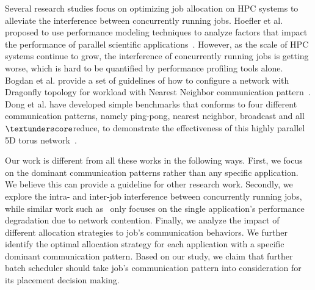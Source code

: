 Several research studies focus on optimizing job allocation on HPC systems 
to alleviate the interference between concurrently running jobs. 
Hoefler et al. proposed to use performance modeling techniques to analyze factors that 
impact the performance of parallel scientific applications~\cite{hoefler-modeling}. 
However, as the scale of HPC systems continue to grow, 
the interference of concurrently running jobs is getting worse, 
which is hard to be quantified by performance profiling tools alone. 
Bogdan et al. provide a set of guidelines of how to configure a network with Dragonfly topology 
for workload with Nearest Neighbor communication pattern~\cite{Bogdan-hpdc14}. 
Dong et al. have developed simple benchmarks that conforms to four different communication patterns, 
namely ping-pong, nearest neighbor, broadcast and all$\textunderscore$reduce, 
to demonstrate the effectiveness of this highly parallel 5D torus network~\cite{Dong-SC11}.

Our work is different from all these works in the following ways. 
First, we focus on the dominant communication patterns rather than any specific application. 
We believe this can provide a guideline for other research work. 
Secondly, we explore the intra- and inter-job interference between concurrently running jobs, 
while similar work such as~\cite{abhinav-sc13} only focuses 
on the single application's performance degradation due to network contention. 
Finally, we analyze the impact of different allocation strategies to job's communication behaviors. 
We further identify the optimal allocation strategy for 
each application with a specific dominant communication pattern. 
Based on our study, we claim that further batch scheduler should take 
job's communication pattern into consideration for its placement decision making. 

